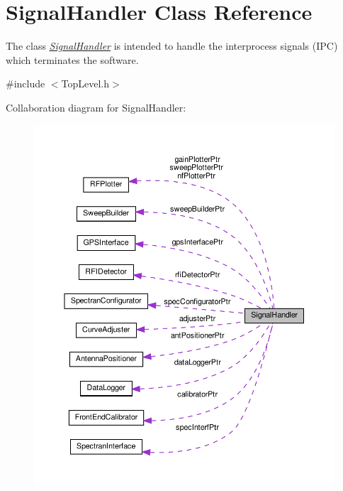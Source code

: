 \hypertarget{classSignalHandler}{}\section{Signal\+Handler Class Reference}
\label{classSignalHandler}


The class {\itshape \hyperlink{classSignalHandler}{Signal\+Handler}} is intended to handle the interprocess signals (I\+PC) which terminates the software.  




{\ttfamily \#include $<$Top\+Level.\+h$>$}



Collaboration diagram for Signal\+Handler\+:\nopagebreak
\begin{figure}[H]
\begin{center}
\leavevmode
\includegraphics[width=350pt]{classSignalHandler__coll__graph}
\end{center}
\end{figure}
